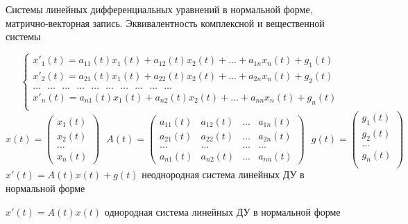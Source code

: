 \begin{title}[\Large]
  Системы линейных дифференциальных уравнений в нормальной форме,
  матрично-векторная запись. Эквивалентность комплексной и вещественной системы
\end{title}

\begin{define}
  $$
  \left\{
  \begin{array}{l}
    x'_1(t) = a_{11}(t)x_1(t) + a_{12}(t)x_2(t) + \ldots
    + a_{1n}x_n(t) + g_1(t) \\
    x'_2(t) = a_{21}(t)x_1(t) + a_{22}(t)x_2(t) + \ldots
    + a_{2n}x_n(t) + g_2(t) \\
    \ldots ~~~ \ldots ~~~ \ldots ~~~ \ldots ~~~ \ldots ~~~ \ldots ~~~
    \ldots ~~~ \ldots ~~~ \ldots ~~~ \ldots\\
    x'_n(t) = a_{n1}(t)x_1(t) + a_{n2}(t)x_2(t) + \ldots
    + a_{nn}x_n(t) + g_n(t) \\
  \end{array}
  \right.
  $$
  $$
  x(t) =
  \left(
  \begin{array}{l}
    x_1(t) \\
    x_2(t) \\
    \ldots \\
    x_n(t)
  \end{array}
  \right) ~~~
  A(t) =
  \left(
  \begin{array}{cccc}
    a_{11}(t) & a_{12}(t) & \ldots & a_{1n}(t) \\
    a_{21}(t) & a_{22}(t) & \ldots & a_{2n}(t) \\
    \ldots & \ldots & \ldots & \ldots \\
    a_{n1}(t) & a_{n2}(t) & \ldots & a_{nn}(t)
  \end{array}
  \right) ~~~
  g(t) =
  \left(
  \begin{array}{l}
    g_1(t) \\
    g_2(t) \\
    \ldots \\
    g_n(t) \\
  \end{array}
  \right)
  $$
  $x'(t) = A(t)x(t) + g(t)$ неоднородная система линейных ДУ в нормальной форме

  $x'(t) = A(t)x(t)$ однородная система линейных ДУ в нормальной форме
\end{define}

